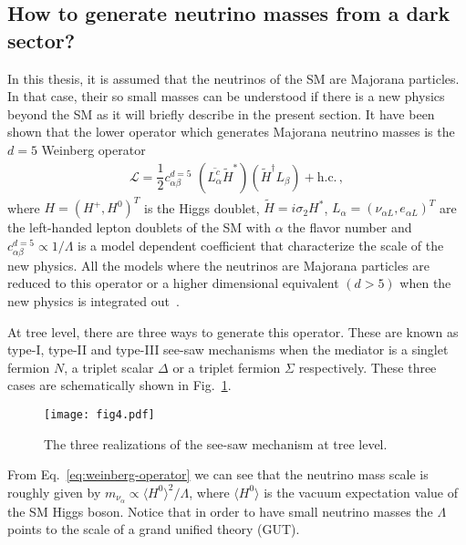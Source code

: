 \subsection*{How to generate neutrino masses from a dark sector?}
%
In this thesis, it is assumed that the neutrinos of the SM are Majorana particles.
In that case, their so small masses can be understood if there is a new physics beyond the SM as it will briefly describe in the present section. 
It have been shown that the lower operator which generates Majorana neutrino masses is the $d=5$ Weinberg operator~\cite{PhysRevLett.43.1566}
%
\begin{align}
\label{eq:weinberg-operator}
\mathcal{L}=\dfrac{1}{2}c_{\alpha\beta}^{d=5} \,\, \left(\overline{L_{\alpha}^c}\widetilde{H}^*\right) \left( \widetilde{H}^{\dagger}L_{\beta}\right) + \text{h.c.}  \,,
\end{align}
%
where $H=\left(H^+,H^0\right)^T$ is the Higgs doublet, $\widetilde{H}=i\sigma_2 H^*$,  $L_{\alpha}=\left(\nu_{\alpha L},e_{\alpha L}\right)^T$ are the left-handed lepton doublets of the SM with $\alpha$ the flavor number and $c_{\alpha\beta}^{d=5}\propto 1/\Lambda $ is a model dependent coefficient that characterize the scale of the new physics.  
All the models where the neutrinos are Majorana particles are reduced to this operator or a higher dimensional equivalent $(d > 5)$ when the new physics is integrated out~\cite{Bonnet:2012kz}.

At tree level, there are three ways to generate this operator. These are known as type-I, type-II and type-III see-saw mechanisms when the mediator is a singlet fermion $N$, a triplet scalar $\Delta$ or a triplet fermion $\Sigma$ respectively. These three cases are schematically shown in Fig.~\ref{fig:see-saw-tree-level}.
%
\begin{figure}[h]
\begin{center}
\texttt{[image: fig4.pdf]}
\end{center}
\caption{The three realizations of the see-saw mechanism at tree level.}
\label{fig:see-saw-tree-level}
\end{figure} 

From Eq.~\eqref{eq:weinberg-operator} we can see that the neutrino mass scale is roughly given by $m_{\nu_{\alpha}}\propto \langle H^0\rangle^2/\Lambda$,  where $\langle H^0\rangle$ is the vacuum expectation value of the SM Higgs boson. Notice that in order to have small neutrino masses the $\Lambda$ points to the scale of a grand unified theory (GUT).  

